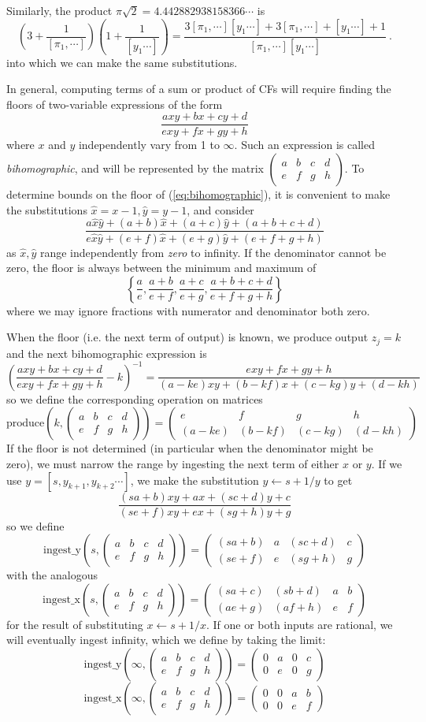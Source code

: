 \documentclass[11pt, oneside]{amsart}   	%
\newcommand{\bihomographic}[8]{\left(\begin{smallmatrix}#1&#2&#3&#4\\#5&#6&#7&#8\end{smallmatrix}\right)}
\newcommand{\abcd}{\left(
\begin{smallmatrix} 
a & b & c & d\\ 
e & f & g & h
\end{smallmatrix}
\right)}
\begin{document}
Similarly, the product $\pi\sqrt{2}=4.442882938158366\cdots$ is
\begin{equation*}
(3 + \frac{1}{[\pi_1,\cdots]})(1 + \frac{1}{[y_1\cdots]}) 
  = \frac{ 3[\pi_1,\cdots][y_1\cdots] + 3[\pi_1,\cdots] + [y_1\cdots] +1 }{[\pi_1,\cdots][y_1\cdots] }\ .
\end{equation*}
into which we can make the same substitutions. 

In general, computing terms of a sum or product of CFs will require finding the floors of two-variable expressions of the form
\begin{equation}\label{eq:bihomographic}
\frac{axy + bx + cy + d}{exy + fx + gy + h}
\end{equation}
where $x$ and $y$ independently vary from 1 to $\infty$. Such an expression is called \emph{bihomographic}, and will be
represented by the matrix $\abcd$. To determine bounds on the floor of (\ref{eq:bihomographic}), it is convenient to make the
substitutions $\hat{x} = x-1, \hat{y} = y-1$, and consider
\[
\frac{a\hat{x}\hat{y} + (a+b)\hat{x} + (a+c)\hat{y} + (a+b+c+d)}{e\hat{x}\hat{y} + (e+f)\hat{x} + (e+g)\hat{y} + (e+f+g+h)}
\]
as $\hat{x}, \hat{y}$ range independently from \emph{zero} to infinity. If the denominator cannot be zero, the floor is always
between the minimum and maximum of
\[
\left\{ \frac{a}{e},\frac{a+b}{e+f},\frac{a+c}{e+g},\frac{a+b+c+d}{e+f+g+h} \right\}
\]
where we may ignore fractions with numerator and denominator both zero.

When the floor (i.e. the next term of output) is known, we produce output $z_j=k$ and the next bihomographic expression is
\[
\left(\frac{axy + bx + cy + d}{exy + fx + gy + h} - k\right)^{-1} = \frac{exy + fx + gy + h}{(a-ke)xy + (b-kf)x + (c-kg)y + (d-kh)}
\]
so we define the corresponding operation on matrices
\begin{equation}
\mbox{produce}(k, \abcd) = \bihomographic{e}{f}{g}{h}{(a-ke)}{(b-kf)}{(c-kg)}{(d-kh)}
\end{equation}
 If the floor is not determined (in particular when the denominator might be zero), we must narrow the range by ingesting the next term of either $x$ or $y$.
 If we use $y = [s,y_{k+1},y_{k+2}\cdots]$, we make the substitution $y \leftarrow s + 1/y$ to get
\[
\frac{(sa+b)xy + ax + (sc+d)y + c}{(se+f)xy + ex + (sg+h)y + g}
\]
so we define
\begin{equation}
\mbox{ingest\_y}(s, \abcd) = \bihomographic{(sa+b)}{a}{(sc+d)}{c}{(se+f)}{e}{(sg+h)}{g}
\end{equation}
with the analogous 
\begin{equation}
\mbox{ingest\_x}(s, \abcd) = \bihomographic{(sa+c)}{(sb+d)}{a}{b} {(ae+g)}{(af+h)}{e}{f}
\end{equation} 
for the result of substituting $x \leftarrow s + 1/x$.
If one or both inputs are rational, we will eventually ingest infinity, which we define by taking the limit:
\begin{equation}
\mbox{ingest\_y}(\infty, \abcd) = \bihomographic{0}{a}{0}{c}{0}{e}{0}{g}
\end{equation}
\begin{equation}
\mbox{ingest\_x}(\infty, \abcd) = \bihomographic{0}{0}{a}{b} {0}{0}{e}{f}
\end{equation} 
\end{document}
